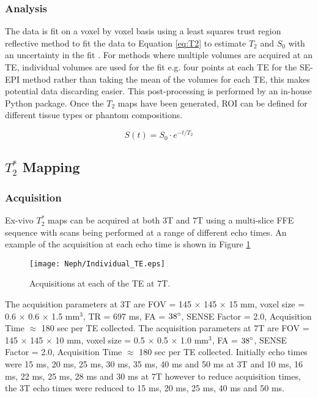 \subsubsection{Analysis}

The data is fit on a voxel by voxel basis using a least squares trust region reflective method to fit the data to Equation \eqref{eq:T2} to estimate $T_2$ and $S_0$ with an uncertainty in the fit \cite{branch_subspace_1999}. For methods where multiple volumes are acquired at an \ac{TE}, individual volumes are used for the fit e.g. four points at each \ac{TE} for the \ac{SE}-\ac{EPI} method rather than taking the mean of the volumes for each \ac{TE}, this makes potential data discarding easier. This post-processing is performed by an in-house Python package. Once the $T_2$ maps have been generated, \ac{ROI} can be defined for different tissue types or phantom compositions.

\begin{equation}
S(t) = S_0 \cdot e^{-t/T_2}
\label{eq:T2}
\end{equation}

\subsection{$T_2^*$ Mapping}
\subsubsection{Acquisition}

Ex-vivo $T_2^*$ maps can be acquired at both 3T and 7T using a multi-slice \ac{FFE} sequence with scans being performed at a range of different echo times. An example of the acquisition at each echo time is shown in Figure \ref{fig:echo_raw_data}

\begin{figure}[H]
	\centering
	\texttt{[image: Neph/Individual\_TE.eps]}
	\caption{Acquisitions at each of the \ac{TE} at 7T.}
	\label{fig:echo_raw_data}	
\end{figure}

The acquisition parameters at 3T are \ac{FOV} = 145 $\times$ 145 $\times$ 15 mm, voxel size = 0.6 $\times$ 0.6 $\times$ 1.5 mm$^3$, \ac{TR} = 697 ms, \ac{FA} = $38\degree$, \ac{SENSE} Factor = 2.0, Acquisition Time $\approx$ 180 sec per \ac{TE} collected. 
The acquisition parameters at 7T are \ac{FOV} = 145 $\times$ 145 $\times$ 10 mm, voxel size = 0.5 $\times$ 0.5 $\times$ 1.0 mm$^3$, \ac{FA} = $38\degree$, \ac{SENSE} Factor = 2.0, Acquisition Time $\approx$ 180 sec per \ac{TE} collected. Initially echo times were 15 ms, 20 ms, 25 ms, 30 ms, 35 ms, 40 ms and 50 ms at 3T and 10 ms, 16 ms, 22 ms, 25 ms, 28 ms and 30 ms at 7T however to reduce acquisition times, the 3T echo times were reduced to 15 ms, 20 ms, 25 ms, 40 ms and 50 ms.

